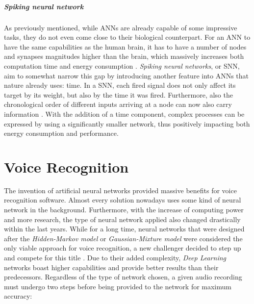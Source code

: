 \documentclass[draft,final]{vutinfth} %
\begin{document}
\subparagraph{Spiking neural network} As previously mentioned, while ANNs are already capable of some impressive tasks, they do not even come close to their biological counterpart. For an ANN to have the same capabilities as the human brain, it has to have a number of nodes and synapses magnitudes higher than the brain, which massively increases both computation time and energy consumption \cite{yamazaki2022spiking}. \emph{Spiking neural networks}, or SNN, aim to somewhat narrow this gap by introducing another feature into ANNs that nature already uses: time. In a SNN, each fired signal does not only affect its target by its weight, but also by the time it was fired. Furthermore, also the chronological order of different inputs arriving at a node can now also carry information \cite{yamazaki2022spiking}. With the addition of a time component, complex processes can be expressed by using a significantly smaller network, thus positively impacting both energy consumption and performance.
\section{Voice Recognition}
The invention of artificial neural networks provided massive benefits for voice recognition software. Almost every solution nowadays uses some kind of neural network in the background. Furthermore, with the increase of computing power and more research, the type of neural network applied also changed drastically within the last years. While for a long time, neural networks that were designed after the \emph{Hidden-Markov model} or \emph{Gaussian-Mixture model} were considered the only viable approach for voice recognition, a new challenger decided to step up and compete for this title \cite{9133298}. Due to their added complexity, \emph{Deep Learning} networks boast higher capabilities and provide better results than their predecessors.
Regardless of the type of network chosen, a given audio recording must undergo two steps before being provided to the network for maximum accuracy:
\end{document}
